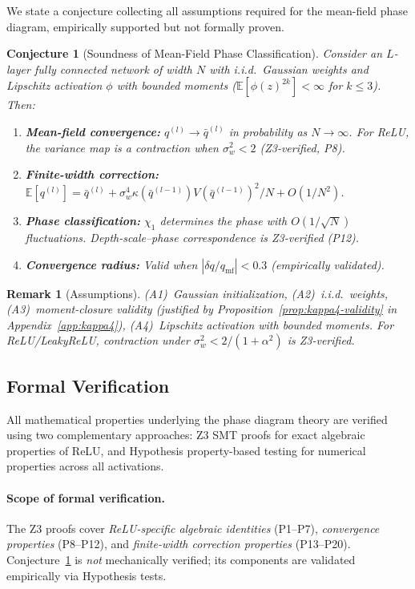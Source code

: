 \documentclass[10pt]{article}
\newcommand{\EE}{\mathbb{E}}
\newtheorem{conjecture}[theorem]{Conjecture}
\newtheorem{remark}[theorem]{Remark}
\begin{document}
We state a conjecture collecting all assumptions required for the mean-field phase diagram, empirically supported but not formally proven.

\begin{conjecture}[Soundness of Mean-Field Phase Classification]
\label{conj:soundness}
Consider an $L$-layer fully connected network of width $N$ with i.i.d.\ Gaussian weights and Lipschitz activation $\phi$ with bounded moments ($\EE[\phi(z)^{2k}] < \infty$ for $k \leq 3$). Then:
\begin{enumerate}[nosep]
    \item \textbf{Mean-field convergence:} $q^{(l)} \to \bar{q}^{(l)}$ in probability as $N \to \infty$. For ReLU, the variance map is a contraction when $\sigma_w^2 < 2$ (Z3-verified, P8).
    \item \textbf{Finite-width correction:} $\EE[q^{(l)}] = \bar{q}^{(l)} + \sigma_w^4 \kappa(\bar{q}^{(l-1)}) V(\bar{q}^{(l-1)})^2 / N + O(1/N^2)$.
    \item \textbf{Phase classification:} $\chi_1$ determines the phase with $O(1/\sqrt{N})$ fluctuations. Depth-scale--phase correspondence is Z3-verified (P12).
    \item \textbf{Convergence radius:} Valid when $|\delta q / q_{\mathrm{mf}}| < 0.3$ (empirically validated).
\end{enumerate}
\end{conjecture}

\begin{remark}[Assumptions]
(A1)~Gaussian initialization, (A2)~i.i.d.\ weights, (A3)~moment-closure validity (justified by Proposition~\ref{prop:kappa4-validity} in Appendix~\ref{app:kappa4}), (A4)~Lipschitz activation with bounded moments.
For ReLU/LeakyReLU, contraction under $\sigma_w^2 < 2/(1+\alpha^2)$ is Z3-verified.
\end{remark}

\subsection{Formal Verification}
\label{sec:verification}

All mathematical properties underlying the phase diagram theory are verified using two complementary approaches: Z3 SMT proofs for exact algebraic properties of ReLU, and Hypothesis property-based testing for numerical properties across all activations.

\paragraph{Scope of formal verification.}
The Z3 proofs cover \emph{ReLU-specific algebraic identities} (P1--P7), \emph{convergence properties} (P8--P12), and \emph{finite-width correction properties} (P13--P20).
Conjecture~\ref{conj:soundness} is \emph{not} mechanically verified; its components are validated empirically via Hypothesis tests.
\end{document}
